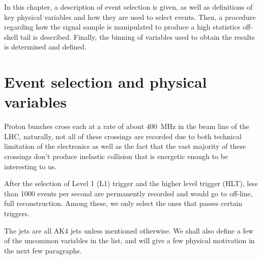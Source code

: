 In this chapter, a description of event selection is given, as well as definitions of
key physical variables and how they are used to select events. Then, a procedure regarding
how the signal sample is manipulated to produce a high statistics off-shell tail is described.
Finally, the binning of variables used to obtain the results is determined and defined.

\section{Event selection and physical variables}
Proton bunches cross each at a rate of about \SI{400}{\mega\hertz} in the beam line of
the LHC, naturally, not all of these crossings are recorded due to both technical
limitation of the electronics as well as the fact that the vast majority of these
crossings don't produce inelastic collision that is energetic enough to be interesting to us.

After the selection of Level 1 (L1) trigger and the higher level trigger (HLT), less than 1000
events per second are permanently recorded and would go to off-line, full reconstruction. Among these,
we only select the ones that passes certain triggers.

The jets are all AK4 jets unless mentioned otherwise. We shall also define a few of the
uncommon variables in the list, and will give a few physical motivation in the next few
paragraphs.

